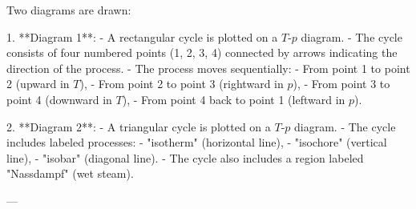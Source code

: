 Two diagrams are drawn:  

1. **Diagram 1**:  
   - A rectangular cycle is plotted on a \( T \)-\( p \) diagram.  
   - The cycle consists of four numbered points (1, 2, 3, 4) connected by arrows indicating the direction of the process.  
   - The process moves sequentially:  
     - From point 1 to point 2 (upward in \( T \)),  
     - From point 2 to point 3 (rightward in \( p \)),  
     - From point 3 to point 4 (downward in \( T \)),  
     - From point 4 back to point 1 (leftward in \( p \)).  

2. **Diagram 2**:  
   - A triangular cycle is plotted on a \( T \)-\( p \) diagram.  
   - The cycle includes labeled processes:  
     - "isotherm" (horizontal line),  
     - "isochore" (vertical line),  
     - "isobar" (diagonal line).  
   - The cycle also includes a region labeled "Nassdampf" (wet steam).  

---